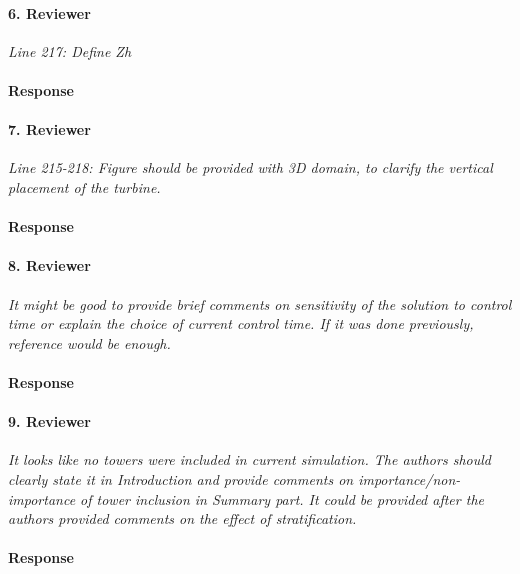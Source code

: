 \documentclass[]{article}
\begin{document}
\hrulefill

\paragraph{6. Reviewer} \textit{Line 217: Define Zh}

\paragraph{Response} 

\hrulefill

\paragraph{7. Reviewer} \textit{Line 215-218: Figure should be provided with 3D domain, to clarify the vertical placement of the turbine.}

\paragraph{Response} 

\hrulefill

\paragraph{8. Reviewer} \textit{It might be good to provide brief comments on sensitivity of the solution to control time or explain the choice of current control time. If it was done previously, reference would be enough.}

\paragraph{Response} 

\hrulefill

\paragraph{9. Reviewer} \textit{It looks like no towers were included in current simulation. The authors should clearly state it in Introduction and provide comments on importance/non-importance of tower inclusion in Summary part. It could be provided after the authors provided comments on the effect of stratification.}

\paragraph{Response} 
\end{document}
